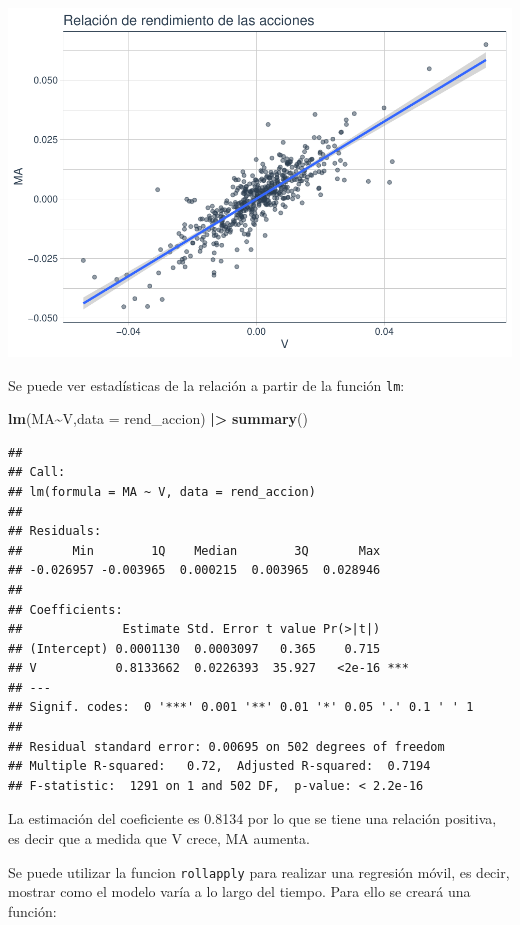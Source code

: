 \documentclass[
]{book}
\newenvironment{Shaded}{\begin{snugshade}}{\end{snugshade}}
\newcommand{\AttributeTok}[1]{\textcolor[rgb]{0.13,0.29,0.53}{#1}}
\newcommand{\FunctionTok}[1]{\textcolor[rgb]{0.13,0.29,0.53}{\textbf{#1}}}
\newcommand{\NormalTok}[1]{#1}
\newcommand{\SpecialCharTok}[1]{\textcolor[rgb]{0.81,0.36,0.00}{\textbf{#1}}}
\begin{document}
\includegraphics{Libro_TidyQualityTools_files/figure-latex/unnamed-chunk-71-1.pdf}

Se puede ver estadísticas de la relación a partir de la función \texttt{lm}:

\begin{Shaded}
\begin{Highlighting}[]
\FunctionTok{lm}\NormalTok{(MA}\SpecialCharTok{\textasciitilde{}}\NormalTok{V,}\AttributeTok{data =}\NormalTok{ rend\_accion) }\SpecialCharTok{|\textgreater{}} \FunctionTok{summary}\NormalTok{()}
\end{Highlighting}
\end{Shaded}

\begin{verbatim}
## 
## Call:
## lm(formula = MA ~ V, data = rend_accion)
## 
## Residuals:
##       Min        1Q    Median        3Q       Max 
## -0.026957 -0.003965  0.000215  0.003965  0.028946 
## 
## Coefficients:
##              Estimate Std. Error t value Pr(>|t|)    
## (Intercept) 0.0001130  0.0003097   0.365    0.715    
## V           0.8133662  0.0226393  35.927   <2e-16 ***
## ---
## Signif. codes:  0 '***' 0.001 '**' 0.01 '*' 0.05 '.' 0.1 ' ' 1
## 
## Residual standard error: 0.00695 on 502 degrees of freedom
## Multiple R-squared:   0.72,  Adjusted R-squared:  0.7194 
## F-statistic:  1291 on 1 and 502 DF,  p-value: < 2.2e-16
\end{verbatim}

La estimación del coeficiente es 0.8134 por lo que se tiene una relación positiva, es decir que a medida que V crece, MA aumenta.

Se puede utilizar la funcion \texttt{rollapply} para realizar una regresión móvil, es decir, mostrar como el modelo varía a lo largo del tiempo. Para ello se creará una función:
\end{document}
